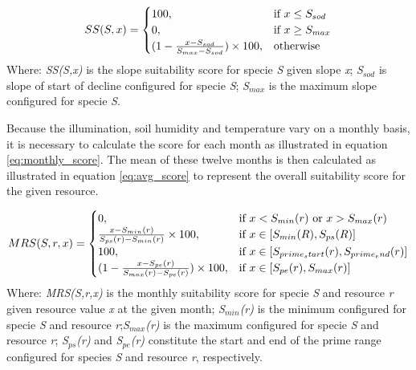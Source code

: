 \begin{equation}
\centering
SS(S,x) = 
\begin{cases}
    100, & \text{if } x \leq S_{sod} \\
    0, & \text{if } x \geq S_{max} \\
	(1-\frac{x-S_{sod}}{S_{max}-S_{sod}}) \times 100, & \text{otherwise}
\end{cases}
\label{eq:slope_suitability_score}
\end{equation}
Where: \textit{SS(S,x)} is the slope suitability score for specie \textit{S} given slope \textit{x}; \textit{S$_{sod}$} is slope of start of decline configured for specie \textit{S}; \textit{S$_{max}$} is the maximum slope configured for specie \textit{S}.

Because the illumination, soil humidity and temperature vary on a monthly basis, it is necessary to calculate the score for each month as illustrated in equation \ref{eq:monthly_score}. The mean of these twelve months is then calculated as illustrated in equation \ref{eq:avg_score} to represent the overall suitability score for the given resource.

\begin{equation}
\centering
MRS(S,r,x) = 
\begin{cases}
    0, & \text{if } x < S_{min}(r) \text{ or } x > S_{max}(r) \\
    \frac{x - S_{min}(r)}{S_{ps}(r) - S_{min}(r)} \times 100, & \text{if } x \in [S_{min}(R),S_{ps}(R)] \\
    100, & \text{if } x \in [S_{prime_start}(r),S_{prime_end}(r)] \\
    (1 - \frac{x - S_{pe}(r)}{S_{max}(r)-S_{pe}(r)}) \times 100, & \text{if } x \in [S_{pe}(r),S_{max}(r)] \\
\end{cases}
\label{eq:monthly_score}
\end{equation}
Where: \textit{MRS(S,r,x)} is the monthly suitability score for specie \textit{S} and resource \textit{r} given resource value \textit{x} at the given month; \textit{S$_{min}$(r)} is the minimum configured for specie \textit{S} and resource \textit{r};\textit{S$_{max}$(r)} is the maximum configured for specie \textit{S} and resource \textit{r}; \textit{S$_{ps}$(r)} and \textit{S$_{pe}$(r)} constitute the start and end of the prime range configured for species \textit{S} and resource \textit{r}, respectively.\\

